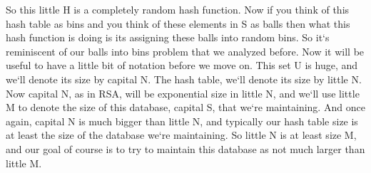 So this little H is a completely random hash function.
Now if you think of this hash table as bins and you think of these elements in S as balls then what this hash function is doing is its assigning these balls into random bins.
So it`s reminiscent of our balls into bins problem that we analyzed before.
Now it will be useful to have a little bit of notation before we move on.
This set U is huge, and we`ll denote its size by capital N\@.
The hash table, we`ll denote its size by little N\@.
Now capital N, as in RSA, will be exponential size in little N, and we`ll use little M to denote the size of this database, capital S, that we`re maintaining.
And once again, capital N is much bigger than little N, and typically our hash table size is at least the size of the database we`re maintaining.
So little N is at least size M, and our goal of course is to try to maintain this database as not much larger than little M\@.

